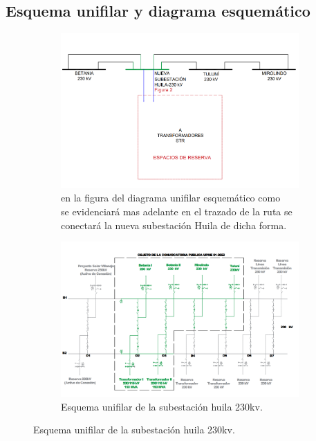 \subsection*{Esquema unifilar y diagrama esquemático}
\begin{figure}[h!] %
    \centering %
    \begin{subfigure}{0.5\textwidth}
        \includegraphics[width=1\textwidth]{1mer avance foticos/Esquema unifilar diagrama esquemático.png}
        \caption{en la figura del diagrama unifilar esquemático como\\ se evidenciará mas adelante en el trazado de la ruta se \\conectará la nueva subestación Huila de dicha forma.} %
        \label{fig:Esquema} %
    \end{subfigure}
    \hfill %
    \begin{subfigure}{0.5\textwidth}
        \centering %
        \includegraphics[width=1\textwidth]{1mer avance foticos/Esquema unifilar de la subestación huila 230kv.png}
        \caption{Esquema unifilar de la subestación huila 230kv.} %
        \label{fig:unifilar} %
    \end{subfigure}
    \label{fig:dos-imagenes}
\end{figure}




